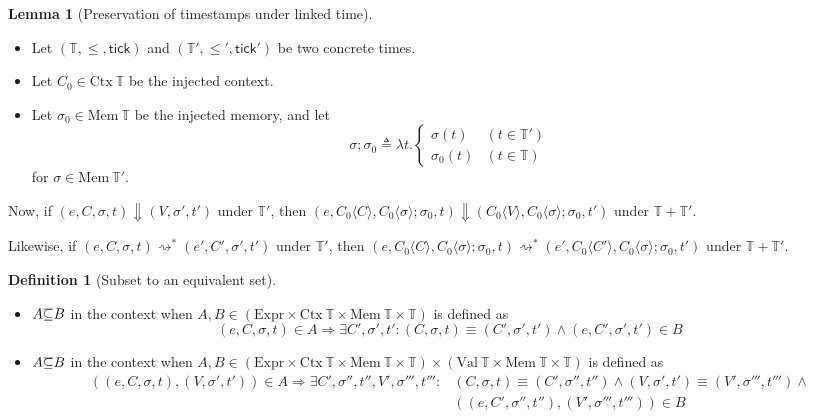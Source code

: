 \documentclass{article}
\theoremstyle{definition}
\newtheorem{definition}{Definition}[section]
\newtheorem{lem}{Lemma}[section]
\def\ovbarw{1.2mu}
\def\ovbarh{0.8}
\newcommand*{\ovbar}[1]{\mkern \ovbarw\overline{\mkern-\ovbarw{\smash{#1}\scalebox{1}[\ovbarh]{\vphantom{i}}}\mkern-\ovbarw}\mkern \ovbarw}
\newcommand*{\Expr}{\text{Expr}}
\newcommand*{\Time}{\mathbb{T}}
\newcommand*{\Ctx}[1]{\text{Ctx}\:{#1}}
\newcommand*{\Value}[1]{\text{Val}\:{#1}}
\newcommand*{\Mem}[1]{\text{Mem}\:{#1}}
\newcommand*{\tick}{\mathsf{tick}}
\newcommand*{\inject}[2]{{#1}\langle{#2}\rangle}
\begin{document}
\begin{lem}[Preservation of timestamps under linked time]
  $\:$

  \begin{itemize}
    \item Let $(\Time,\le,\tick)$ and $(\Time',\le',\tick')$ be two concrete times.
    \item Let $C_{0}\in\Ctx{\Time}$ be the injected context.
    \item Let $\sigma_{0}\in\Mem{\Time}$ be the injected memory, and let
          \[
            \sigma;\sigma_{0}\triangleq\lambda t.
            \begin{cases}
              \sigma(t)     & (t\in\Time') \\
              \sigma_{0}(t) & (t\in\Time)
            \end{cases}
          \]
          for $\sigma\in\Mem{\Time'}$.
  \end{itemize}

  Now, if $(e,C,\sigma,t)\Downarrow(V,\sigma',t')$ under $\Time'$, then
  $(e,\inject{C_0}{C},\inject{C_0}{\sigma};\sigma_{0},t)\Downarrow(\inject{C_0}{V},\inject{C_0}{\sigma};\sigma_0,t')$ under $\Time+\Time'$.

  Likewise, if $(e,C,\sigma,t)\rightsquigarrow^{*}(e',C',\sigma',t')$ under $\Time'$, then
  $(e,\inject{C_0}{C},\inject{C_0}{\sigma};\sigma_{0},t)\rightsquigarrow^{*}(e',\inject{C_0}{C'},\inject{C_0}{\sigma};\sigma_0,t')$ under $\Time+\Time'$.
\end{lem}

\begin{definition}[Subset to an equivalent set]
  $\:$

  \begin{itemize}
    \item $A\ovbar{\subseteq}B$ in the context when $A,B\in(\Expr\times\Ctx{\Time}\times\Mem{\Time}\times\Time)$ is defined as
          \[
            (e,C,\sigma,t)\in A\Rightarrow \exists C',\sigma',t' : (C,\sigma,t)\equiv(C',\sigma',t')\wedge(e,C',\sigma',t')\in B
          \]
    \item $A\ovbar{\subseteq}B$ in the context when $A,B\in(\Expr\times\Ctx{\Time}\times\Mem{\Time}\times\Time)\times(\Value{\Time}\times\Mem{\Time}\times\Time)$ is defined as
          \begin{align*}
            ((e,C,\sigma,t),(V,\sigma',t'))\in A\Rightarrow \exists C',\sigma'',t'',V',\sigma''',t''' : & (C,\sigma,t)\equiv(C',\sigma'',t'')\wedge(V,\sigma',t')\equiv(V',\sigma''',t''')\wedge \\
                                                                                                        & ((e,C',\sigma'',t''),(V',\sigma''',t'''))\in B
          \end{align*}
  \end{itemize}
\end{definition}
\end{document}
